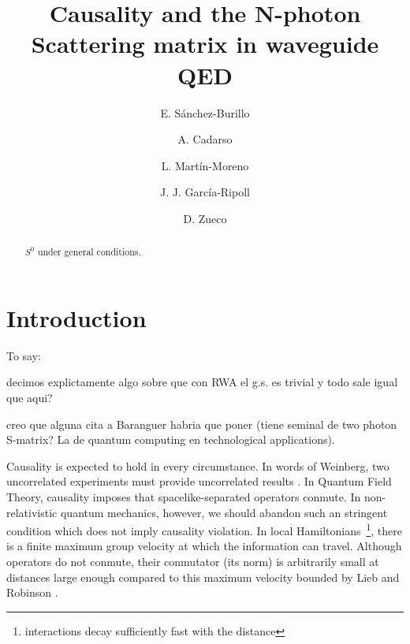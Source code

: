 \documentclass[notitlepage, prx, preprint, amsmath,superscriptaddress,amssymb]{revtex4-1}
\begin{document}
\title{Causality and the N-photon Scattering matrix in waveguide QED}

\author{E. S\'anchez-Burillo}

\author{A. Cadarso}

\author{L. Mart\'in-Moreno}

\author{J. J. Garc\'ia-Ripoll}

\author{D. Zueco}



\begin{abstract}
$S^0$ under general conditions.
\end{abstract}



\maketitle

\section{Introduction}


{\color{red}
To say:

decimos explictamente algo sobre que con RWA el g.s. es trivial y todo sale igual que aqui?


creo que alguna cita a Baranguer habria que poner (tiene seminal de two photon S-matrix? La de quantum computing en technological applications).

}

Causality is  expected to hold in every circumstance.    In words of Weinberg, two uncorrelated experiments must provide uncorrelated results \cite{Weinberg1996}.     In Quantum Field Theory, causality imposes that  spacelike-separated operators conmute.   In non-relativistic quantum mechanics, however, we should abandon such an stringent condition which  does not imply causality violation.  In local Hamiltonians~\footnote{interactions decay sufficiently fast with the distance}, there is a finite maximum  group velocity at which the information can travel.   Although operators do not conmute,  their conmutator  (its norm) is arbitrarily small at distances large enough compared to this maximum velocity  bounded by Lieb and Robinson \cite{Lieb1972}.  
\end{document}
